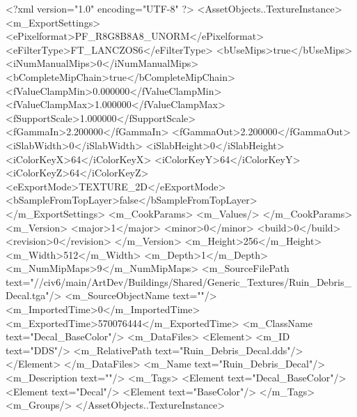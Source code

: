 <?xml version="1.0" encoding="UTF-8" ?>
<AssetObjects..TextureInstance>
	<m_ExportSettings>
		<ePixelformat>PF_R8G8B8A8_UNORM</ePixelformat>
		<eFilterType>FT_LANCZOS6</eFilterType>
		<bUseMips>true</bUseMips>
		<iNumManualMips>0</iNumManualMips>
		<bCompleteMipChain>true</bCompleteMipChain>
		<fValueClampMin>0.000000</fValueClampMin>
		<fValueClampMax>1.000000</fValueClampMax>
		<fSupportScale>1.000000</fSupportScale>
		<fGammaIn>2.200000</fGammaIn>
		<fGammaOut>2.200000</fGammaOut>
		<iSlabWidth>0</iSlabWidth>
		<iSlabHeight>0</iSlabHeight>
		<iColorKeyX>64</iColorKeyX>
		<iColorKeyY>64</iColorKeyY>
		<iColorKeyZ>64</iColorKeyZ>
		<eExportMode>TEXTURE_2D</eExportMode>
		<bSampleFromTopLayer>false</bSampleFromTopLayer>
	</m_ExportSettings>
	<m_CookParams>
		<m_Values/>
	</m_CookParams>
	<m_Version>
		<major>1</major>
		<minor>0</minor>
		<build>0</build>
		<revision>0</revision>
	</m_Version>
	<m_Height>256</m_Height>
	<m_Width>512</m_Width>
	<m_Depth>1</m_Depth>
	<m_NumMipMaps>9</m_NumMipMaps>
	<m_SourceFilePath text="//civ6/main/ArtDev/Buildings/Shared/Generic_Textures/Ruin_Debris_Decal.tga"/>
	<m_SourceObjectName text=""/>
	<m_ImportedTime>0</m_ImportedTime>
	<m_ExportedTime>570076444</m_ExportedTime>
	<m_ClassName text="Decal_BaseColor"/>
	<m_DataFiles>
		<Element>
			<m_ID text="DDS"/>
			<m_RelativePath text="Ruin_Debris_Decal.dds"/>
		</Element>
	</m_DataFiles>
	<m_Name text="Ruin_Debris_Decal"/>
	<m_Description text=""/>
	<m_Tags>
		<Element text="Decal_BaseColor"/>
		<Element text="Decal"/>
		<Element text="BaseColor"/>
	</m_Tags>
	<m_Groups/>
</AssetObjects..TextureInstance>

